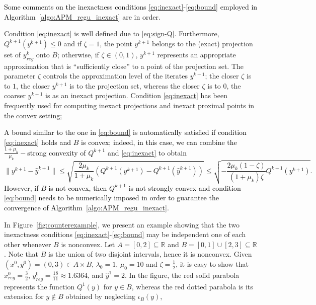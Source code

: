 \documentclass[pdflatex,sn-mathphys-num]{sn-jnl}
\numberwithin{equation}{section}%
\def\R{\mathbb{R}}
\newcommand{\yck}{{y_{reg}^k}}
\newcommand{\REV}[1]{\textcolor{black}{#1}}
\theoremstyle{thmstyleone}%
\theoremstyle{thmstyletwo}%
\theoremstyle{thmstylethree}%
\begin{document}
\REV{Some comments on the inexactness conditions \eqref{eq:inexact}-\eqref{eq:bound} employed in Algorithm~\ref{algo:APM_regu_inexact} are in order}. 
\begin{itemize}
    \item Condition \eqref{eq:inexact} is well defined due to \eqref{eq:sign-Q}. Furthermore,  $Q^{k+1}(y^{k+1})\leq 0$ and if $\zeta=1$, the point $y^{k+1}$ belongs to the (exact) projection set of $\yck$ onto $B$; otherwise, if $\zeta\in (0,1)$, $y^{k+1}$ represents an appropriate approximation that is ``sufficiently close'' to a point of the projection set. The parameter $\zeta$ controls the approximation level of the iterates $y^{k+1}$; the closer $\zeta$ is to $1$, the closer $y^{k+1}$ is to the projection set, whereas the closer $\zeta$ is to $0$, the coarser $y^{k+1}$ is as an inexact projection. Condition \eqref{eq:inexact} has been frequently used for computing inexact projections \cite{Birgin2003,Ferreira-2022} and inexact proximal points \cite{Bonettini-Prato-Rebegoldi-2021} in the convex setting;
    \item \REV{A bound similar to the one in \eqref{eq:bound} is automatically satisfied if condition \eqref{eq:inexact} holds and $B$ is convex; indeed, in this case, we can combine the $\frac{1+\mu_k}{\mu_k}-$strong convexity of $Q^{k+1}$ and \eqref{eq:inexact} to obtain
    \begin{equation}\label{eq:bound_bis}
    \|y^{k+1}-\hat{y}^{k+1}\|\leq \sqrt{\frac{2\mu_k}{1+\mu_k} (Q^{k+1}(y^{k+1})-Q^{k+1}(\hat{y}^{k+1}))}\leq \sqrt{-\frac{2\mu_k(1-\zeta)}{(1+\mu_k)\zeta} Q^{k+1}(y^{k+1})}.
    \end{equation}
    However, if $B$ is not convex, then $Q^{k+1}$ is not strongly convex and condition \eqref{eq:bound} needs to be numerically imposed in order to guarantee the convergence of Algorithm~\ref{algo:APM_regu_inexact}.}
    {%
    \item In Figure~\ref{fig:counterexample}, we present an example showing that the two inexactness conditions \eqref{eq:inexact}-\eqref{eq:bound} may be independent one of each other whenever $B$ is nonconvex.
    Let $A = [0,2]\subseteq \R$ and $B = [0,1]\cup [2,3]\subseteq \R$. Note that $B$ is the union of two disjoint intervals, hence it is nonconvex. Given $(x^0,y^0)=(0,3)\in A\times B$, $\lambda_0=1$, $\mu_0 = 10$ and $\zeta=\frac{1}{2}$, it is easy to show that $x^0_{reg} = \frac{3}{2}$, $y^0_{reg} = \frac{18}{11} \approx 1.6364$, and $\hat{y}^1 = 2$. 
    In the figure, the red solid parabola represents the function $Q^1(y)$ for $y \in B$, whereas the red dotted parabola is its extension for $y \notin B$ obtained by neglecting $\iota_B(y)$,
}
\end{itemize}
\end{document}
